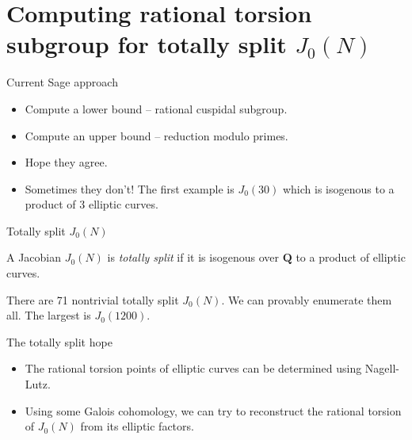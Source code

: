 \documentclass{beamer}
\newcommand{\QQ}{\mathbf{Q}}
\begin{document}
\section{Computing rational torsion subgroup for totally split $J_0(N)$}

\begin{frame}{Current Sage approach}
    \begin{itemize}
        \item
            Compute a lower bound -- rational cuspidal subgroup.
        \item
            Compute an upper bound -- reduction modulo primes.
        \item
            Hope they agree. 
        \item
            Sometimes they don't! The first example is $J_0(30)$ which is
            isogenous to a product of 3 elliptic curves.
    \end{itemize}
\end{frame}

\begin{frame}{Totally split $J_0(N)$}
    \begin{definition}
        A Jacobian $J_0(N)$ is \emph{totally split} if it is isogenous over
        $\QQ$ to a product of elliptic curves.
    \end{definition}

    \begin{theorem}[L.]
        There are 71 nontrivial totally split $J_0(N)$. We can provably
        enumerate them all. The largest is $J_0(1200)$.
    \end{theorem}
\end{frame}

\begin{frame}{The totally split hope}
    \begin{itemize}
        \item 
            The rational torsion points of elliptic curves can be determined
            using Nagell-Lutz.
        \item
            Using some Galois cohomology, we can try to reconstruct the
            rational torsion of $J_0(N)$ from its elliptic factors.
    \end{itemize}
\end{frame}
\end{document}
